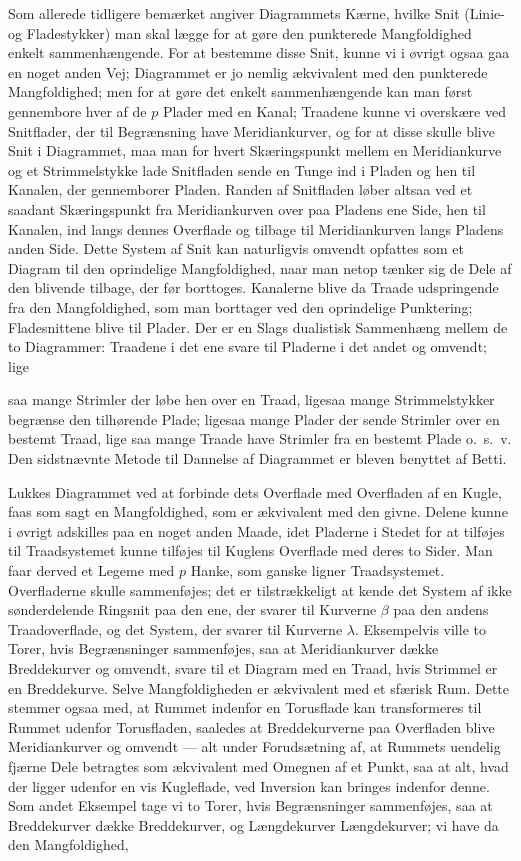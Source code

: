 \documentclass{article}
\begin{document}
Som allerede tidligere bemærket angiver Diagrammets Kærne, hvilke Snit (Linie- og Fladestykker) man skal lægge for at gøre den punkterede Mangfoldighed enkelt sammenhængende. For at bestemme disse Snit, kunne vi i øvrigt ogsaa gaa en noget anden Vej; Diagrammet er jo nemlig ækvivalent med den punkterede Mangfoldighed; men for at gøre det enkelt sammenhængende kan man først gennembore hver af de $p$ Plader med en Kanal; Traadene kunne vi overskære ved Snitflader, der til Begrænsning have Meridiankurver, og for at disse skulle blive Snit i Diagrammet, maa man for hvert Skæringspunkt mellem en Meridiankurve og et Strimmelstykke lade Snitfladen sende en Tunge ind i Pladen og hen til Kanalen, der gennemborer Pladen. Randen af Snitfladen løber altsaa ved et saadant Skæringspunkt fra Meridiankurven over paa Pladens ene Side, hen til Kanalen, ind langs dennes Overflade og tilbage til Meridiankurven langs Pladens anden Side. Dette System af Snit kan naturligvis omvendt opfattes som et Diagram til den oprindelige Mangfoldighed, naar man netop tænker sig de Dele af den blivende tilbage, der før borttoges. Kanalerne blive da Traade udspringende fra den Mangfoldighed, som man borttager ved den oprindelige Punktering; Fladesnittene blive til Plader. Der er en Slags dualistisk Sammenhæng mellem de to Diagrammer: Traadene i det ene svare til Pladerne i det andet og omvendt; lige

saa mange Strimler der løbe hen over en Traad, ligesaa mange Strimmelstykker begrænse den tilhørende Plade; ligesaa mange Plader der sende Strimler over en bestemt Traad, lige saa mange Traade have Strimler fra en bestemt Plade o.~s.~v. Den sidstnævnte Metode til Dannelse af Diagrammet er bleven benyttet af Betti.

Lukkes Diagrammet ved at forbinde dets Overflade med Overfladen af en Kugle, faas som sagt en Mangfoldighed, som er ækvivalent med den givne. Delene kunne i øvrigt adskilles paa en noget anden Maade, idet Pladerne i Stedet for at tilføjes til Traadsystemet kunne tilføjes til Kuglens Overflade med deres to Sider. Man faar derved et Legeme med $p$ Hanke, som ganske ligner Traadsystemet. Overfladerne skulle sammenføjes; det er tilstrækkeligt at kende det System af ikke sønderdelende Ringsnit paa den ene, der svarer til Kurverne $\beta$ paa den andens Traadoverflade, og det System, der svarer til Kurverne $\lambda$. Eksempelvis ville to Torer, hvis Begrænsninger sammenføjes, saa at Meridiankurver dække Breddekurver og omvendt, svare til et Diagram med en Traad, hvis Strimmel er en Breddekurve. Selve Mangfoldigheden er ækvivalent med et sfærisk Rum. Dette stemmer ogsaa med, at Rummet indenfor en Torusflade kan transformeres til Rummet udenfor Torusfladen, saaledes at Breddekurverne paa Overfladen blive Meridiankurver og omvendt --- alt under Forudsætning af, at Rummets uendelig fjærne Dele betragtes som ækvivalent med Omegnen af et Punkt, saa at alt, hvad der ligger udenfor en vis Kugleflade, ved Inversion kan bringes indenfor denne. Som andet Eksempel tage vi to Torer, hvis Begrænsninger sammenføjes, saa at Breddekurver dække Breddekurver, og Længdekurver Længdekurver; vi have da den Mangfoldighed,
\end{document}

